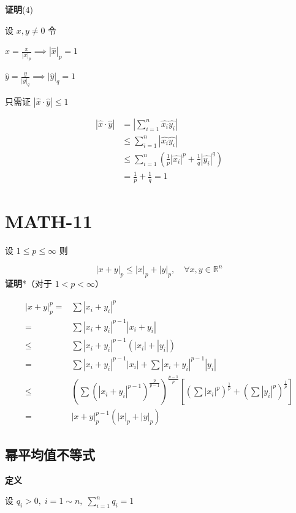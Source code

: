 \textbf{证明}(4)

设 \(x,y\neq {0}\) 令

\(\hat{x}=\frac{x}{|x|_{p}} \implies |\hat{x}|_{p}=1\)

\(\hat{y}=\frac{y}{|y|_{q}}\implies |\hat{y}|_{q}=1\)

只需证 \(|\hat{x}\cdot\hat{y}|\leq 1\)

\[
\begin{aligned}
|\hat{x}\cdot \hat{y} | &= \left|\sum_{i=1}^{n}\hat{x_{i}} \hat{y_{i}}\right|
\\
&\leq \sum_{i=1}^{n}|\hat{x_{i}}\hat{y_{i}}|
\\
&\leq \sum_{i=1}^{n}\left(\frac{1}{p}|\hat{x_{i}}|^{p}+\frac{1}{q}|\hat{y_{i}}|^{q}\right)
\\
&=\frac{1}{p}+\frac{1}{q}=1
\end{aligned}
\]

\section{MATH-11}\label{math-11}

设 \(1\leq p\leq \infty\) 则

\[
|x+y|_{p}\leq |x|_{p}+|y|_{p}, \quad \forall x, y \in \mathbb{R}^n
\] \textbf{证明}*（对于 \(1<p<\infty\)）

\[
\begin{aligned}
|x+y|_{p}^{p}=&\sum|x_{i}+y_{i}|^{p}
\\
=&\sum|x_{i}+y_{i}|^{p-1}|x_{i}+y_{i}|
\\
\leq&\sum|x_{i}+y_{i}|^{p-1}(|x_{i}|+|y_{i}|)
\\
=&\sum|x_{i}+y_{i}|^{p-1}|x_{i}|+\sum |x_{i}+y_{i}|^{p-1}|y_{i}|
\\
\leq&\left(\sum\left(|x_{i}+y_{i}|^{p-1}\right)^{\frac{p}{p-1}} \right)^{\frac{p-1}{p}}\left[\left( \sum|x_{i}|^{p} \right)^{\frac{1}{p}}+\left( \sum|y_{i}|^{p} \right)^{\frac{1}{p}}\right]
\\
=&|x+y|_{p}^{p-1}\left(|x|_{p}+|y|_{p}\right)
\end{aligned}
\]

\subsection{幂平均值不等式}\label{ux5e42ux5e73ux5747ux503cux4e0dux7b49ux5f0f}

\textbf{定义}

设 \(q_{i}>0, \; i=1\sim n, \; \sum_{i=1}^{n}q_{i}=1\)

